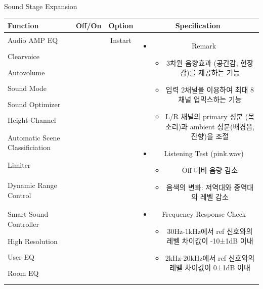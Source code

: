 \documentclass{beamer}
\begin{document}
	
	\begin{frame}[t]{Sound Stage Expansion}
		\begin{tiny}
			\begin{tabular}{@{}lccc@{}}
				\toprule
				Function & Off/On & Option & Specification \\
				\midrule
				Audio AMP EQ & \color{black}{Off} & Instart &
				\multirow{14}{60mm}{
					\begin{itemize}
						\item Remark
						\begin{itemize}
							\item 3차원 음향효과 (공간감, 현장감)를 제공하는 기능
							\item 입력 2채널을 이용하여 최대 8채널 업믹스하는 기능
							\item L/R 채널의 primary 성분 (목소리)과 ambient 성분(배경음, 잔향)을 조절
						\end{itemize}
						\item Listening Test (pink.wav)
						\begin{itemize}
							\item Off 대비 음량 감소
							\item 음색의 변화: 저역대와 중역대의 레벨 감소
						\end{itemize}
						\item Frequency Response Check
						\begin{itemize}
							\item 30Hz-1kHz에서 ref 신호와의 레벨 차이값이 -10±1dB 이내
							\item 2kHz-20kHz에서 ref 신호와의 레벨 차이값이 0±1dB 이내
						\end{itemize}
					\end{itemize}
				} \\
				Clearvoice & \color{black}{Off} & & \\
				Autovolume & \color{black}{Off} & & \\
				Sound Mode & \color{black}{Off} & & \\
				Sound Optimizer & \color{black}{Off} & & \\
				Height Channel & \color{black}{Off} & & \\
				Automatic Scene Classificiation & \color{black}{Off} & & \\
				Limiter & \color{black}{Off} & & \\
				\color{blue}{Sound Stage Expansion} & \color{blue}{On} & & \\
				Dynamic Range Control & \color{black}{Off} & & \\
				Smart Sound Controller & \color{black}{Off} & & \\
				High Resolution & \color{black}{Off} & & \\
				User EQ & \color{black}{Off} & & \\
				Room EQ & \color{black}{Off} & & \\
				\color{blue}{OSD Volume} & \color{blue}{On} &  \color{blue}{Vol.40} & \\
				\midrule
			\end{tabular}
		\end{tiny}
		

\end{frame}
\end{document}
